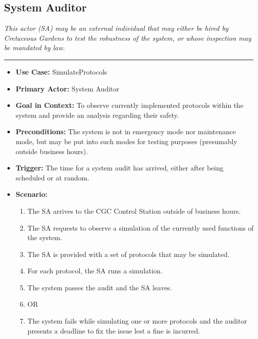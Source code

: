 \documentclass[12pt]{article}
\begin{document}
    \subsection{System Auditor}
    \textit{This actor (SA) may be an external individual that may either be hired by Cretaceous 
    Gardens to test the robustness of the system, or whose inspection may be mandated by law.}
    \par\noindent\rule{\textwidth}{0.4pt}    
    \begin{itemize}
        \item[]\textbf{Use Case:}                                
            SimulateProtocols

        \item[]\textbf{Primary Actor:}
            System Auditor

        \item[]\textbf{Goal in Context:}
            To observe currently implemented protocols within the system and provide an analysis
            regarding their safety.

        \item[]\textbf{Preconditions:}
            The system is not in emergency mode nor maintenance mode, but may be put into such
            modes for testing purposes (presumably outside business hours).

        \item[]\textbf{Trigger:}
            The time for a system audit has arrived, either after being scheduled or at random.

        \item[]\textbf{Scenario:}
            \begin{enumerate}
                \item The SA arrives to the CGC Control Station outside of business hours.
                \item The SA requests to observe a simulation of the currently used functions of the system.
                \item The SA is provided with a set of protocols that may be simulated.
                \item For each protocol, the SA runs a simulation.
                \item The system passes the audit and the SA leaves.
                \item OR
                \item The system fails while simulating one or more protocols and the auditor presents a deadline
                to fix the issue lest a fine is incurred.
            \end{enumerate}


\end{itemize}
\end{document}
